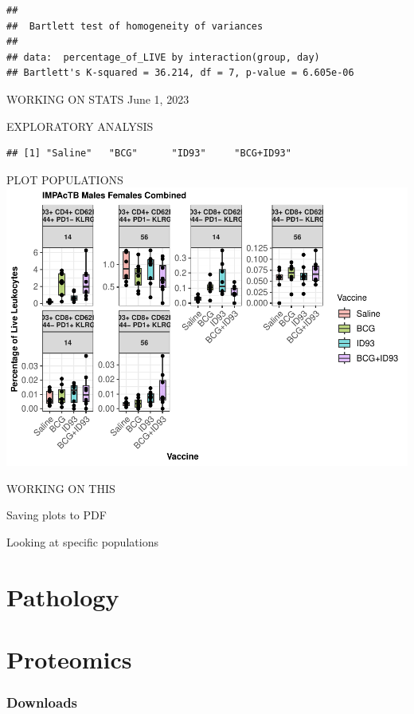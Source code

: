 \documentclass[
]{book}
\begin{document}
\begin{verbatim}
## 
##  Bartlett test of homogeneity of variances
## 
## data:  percentage_of_LIVE by interaction(group, day)
## Bartlett's K-squared = 36.214, df = 7, p-value = 6.605e-06
\end{verbatim}

WORKING ON STATS June 1, 2023

EXPLORATORY ANALYSIS

\begin{verbatim}
## [1] "Saline"   "BCG"      "ID93"     "BCG+ID93"
\end{verbatim}

PLOT POPULATIONS
\includegraphics{csu-impactb_files/figure-latex/unnamed-chunk-75-1.pdf}

WORKING ON THIS

Saving plots to PDF

Looking at specific populations

\hypertarget{pathology}{%
\chapter{Pathology}\label{pathology}}

\hypertarget{proteomics}{%
\chapter{Proteomics}\label{proteomics}}

\hypertarget{downloads-2}{%
\subsection{Downloads}\label{downloads-2}}
\end{document}
